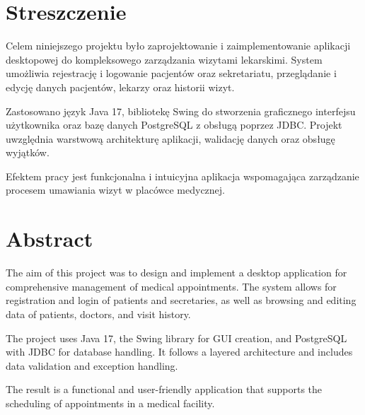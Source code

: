 \chapter*{Streszczenie}

Celem niniejszego projektu było zaprojektowanie i zaimplementowanie aplikacji desktopowej do kompleksowego zarządzania wizytami lekarskimi. System umożliwia rejestrację i logowanie pacjentów oraz sekretariatu, przeglądanie i edycję danych pacjentów, lekarzy oraz historii wizyt. 

Zastosowano język Java 17, bibliotekę Swing do stworzenia graficznego interfejsu użytkownika oraz bazę danych PostgreSQL z obsługą poprzez JDBC. Projekt uwzględnia warstwową architekturę aplikacji, walidację danych oraz obsługę wyjątków.

Efektem pracy jest funkcjonalna i intuicyjna aplikacja wspomagająca zarządzanie procesem umawiania wizyt w placówce medycznej.

\vspace{1cm}

\chapter*{Abstract}

The aim of this project was to design and implement a desktop application for comprehensive management of medical appointments. The system allows for registration and login of patients and secretaries, as well as browsing and editing data of patients, doctors, and visit history.

The project uses Java 17, the Swing library for GUI creation, and PostgreSQL with JDBC for database handling. It follows a layered architecture and includes data validation and exception handling.

The result is a functional and user-friendly application that supports the scheduling of appointments in a medical facility.
